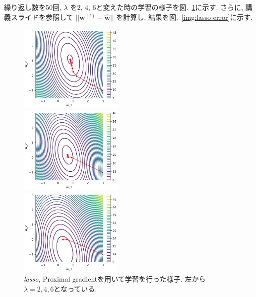 \documentclass[a4paper,10pt]{jsarticle}
\begin{document}
繰り返し数を$50$回, $\lambda$ を$2$, $4$, $6$と変えた時の学習の様子を図.~\ref{img:lasso-result}に示す.
さらに, 講義スライドを参照して $||\bm{w}^{(t)} - \hat{\bm{w}}||$ を計算し,
結果を図.~\ref{img:lasso-error}に示す.


\begin{figure}[htbp]
 \begin{minipage}{0.33\hsize}
  \begin{center}
   \includegraphics[width=5cm]{figs/p2_lasso_result_lambda-2.pdf}
  \end{center}
 \end{minipage}
 \begin{minipage}{0.33\hsize}
  \begin{center}
   \includegraphics[width=5cm]{figs/p2_lasso_result_lambda-4.pdf}
  \end{center}
 \end{minipage}
 \begin{minipage}{0.33\hsize}
  \begin{center}
   \includegraphics[width=5cm]{figs/p2_lasso_result_lambda-6.pdf}
  \end{center}
 \end{minipage}
 \caption{\textit{lasso}, Proximal gradientを用いて学習を行った様子. 
 左から $\lambda=2, 4, 6$となっている.}
 \label{img:lasso-result}
\end{figure}
\end{document}
